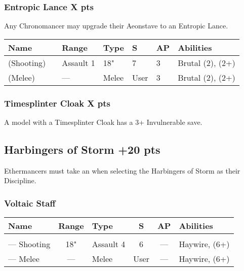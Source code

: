 \subsubsection[Entropic Lance ]{Entropic Lance  \hrulefill X pts} \label{Entropic Lance}

Any Chronomancer may upgrade their Aeonstave to an Entropic Lance.

\noindent
\begin{tabular}{||m{130pt} m{10pt} m{31pt} m{55pt} m{12pt} m{12pt} m{210pt}||}
	\hline
	Name & & Range & Type & S & AP & Abilities \\
	\hline
	\quickref{Entropic Lance} (Shooting) & & Assault 1 & 18" & 7 & 3 & Brutal (2), \quickref{Entropic Strike} (2+) \\
	\quickref{Entropic Lance} (Melee) & & — & Melee & User & 3 & Brutal (2), \quickref{Entropic Strike} (2+) \\
	\hline
\end{tabular}

\subsubsection[Timesplinter Cloak ]{Timesplinter Cloak  \hrulefill X pts}

A model with a Timesplinter Cloak has a 3+ Invulnerable save.


\subsection[Harbingers of Storm ]{Harbingers of Storm  \hrulefill +20 pts}

Ethermancers must take an  when selecting the Harbingers of Storm as their Discipline.

\subsubsection{Voltaic Staff}
\label{Voltaic Staff}
\noindent
\begin{NiceTabular}{L{115 pt} c C{40pt} *{2}{c} >{\raggedright\arraybackslash}p{240pt}}
	Name & Range & Type & S & AP & Abilities \\
	\hline
	 &  &  &  &  & \\
	— Shooting & 18" & Assault 4 & 6 & — & Haywire,  (6+) \\
	— Melee & — & Melee & User & — & Haywire,  (6+) \\
\end{NiceTabular}

